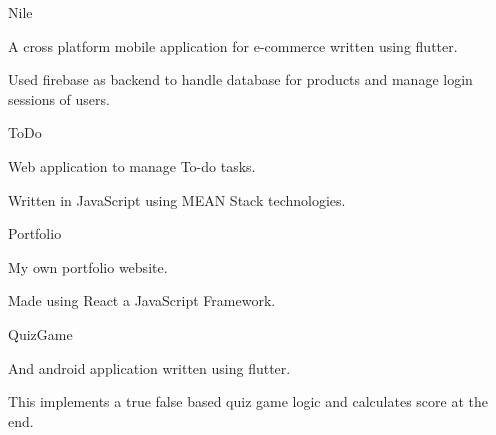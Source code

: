 
\begin{cventries}
  \cventry
    {} %
    {Nile} %
    {} %
    {} %
    {
      \begin{cvitems} %
        \item {A cross platform mobile application for e-commerce written using flutter.}
		\item {Used firebase as backend to handle database for products and manage login sessions of users.}
      \end{cvitems}
    }

  \cventry
    {} %
    {ToDo} %
    {} %
    {} %
    {
      \begin{cvitems} %
      	\item {Web application to manage To-do tasks.}
		\item {Written in JavaScript using MEAN  Stack technologies.}
      \end{cvitems}
    }
    
    \cventry
    {} %
    {Portfolio} %
    {} %
    {} %
    {
      \begin{cvitems} %
      	\item {My own portfolio website.}
		\item {Made using React a JavaScript Framework.}
      \end{cvitems}
    }
    
    \cventry
    {} %
    {QuizGame} %
    {} %
    {} %
    {
      \begin{cvitems} %
      	\item {And android application written using flutter.}
		\item {This implements a true false based quiz game logic and calculates score at the end.}
      \end{cvitems}
    }
    
\end{cventries}